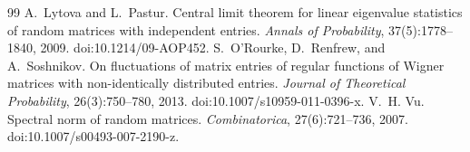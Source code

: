 \documentclass[10pt,a4paper]{amsart}
\begin{document}
\begin{thebibliography}{99}
 A.~Lytova and L.~Pastur. \newblock Central limit theorem for linear eigenvalue statistics of random matrices with independent entries. \newblock \emph{Annals of Probability}, 37(5):1778--1840, 2009. \newblock doi:10.1214/09-AOP452.
 S.~O'Rourke, D.~Renfrew, and A.~Soshnikov. \newblock On fluctuations of matrix entries of regular functions of Wigner matrices with non-identically distributed entries. \newblock \emph{Journal of Theoretical Probability}, 26(3):750--780, 2013. \newblock doi:10.1007/s10959-011-0396-x.
 V.~H. Vu. \newblock Spectral norm of random matrices. \newblock \emph{Combinatorica}, 27(6):721--736, 2007. \newblock doi:10.1007/s00493-007-2190-z.
\end{thebibliography}
\end{document}
